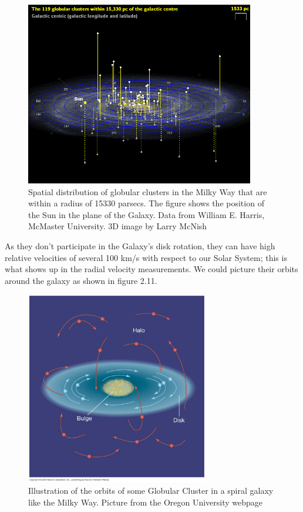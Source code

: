 \begin{figure}[H]
\centering
\includegraphics[width=10cm]{images/Globulars4.png}
\caption[Spatial distribution of globular clusters in the Milky Way]{Spatial distribution of globular clusters in the Milky Way that are within a radius of 15330 parsecs. The figure shows the position of the Sun in the plane of the Galaxy. Data from William E. Harris, McMaster University. 3D image by Larry McNish \cite{18}}
\end{figure}

As they don't participate in the Galaxy's disk rotation, they can have high relative velocities of several 100 km/s with respect to our Solar System; this is what shows up in the radial velocity measurements. We could picture their orbits around the galaxy as shown in figure 2.11.

\begin{figure}[H]
\centering
\includegraphics[width=8cm]{images/orbits_gcs.jpg}
\caption[Illustration of the orbits of Globular Clusters around a spiral galaxy]{Illustration of the orbits of some Globular Cluster in a spiral galaxy like the Milky Way. Picture from the Oregon University webpage \cite{22}}
\end{figure}

